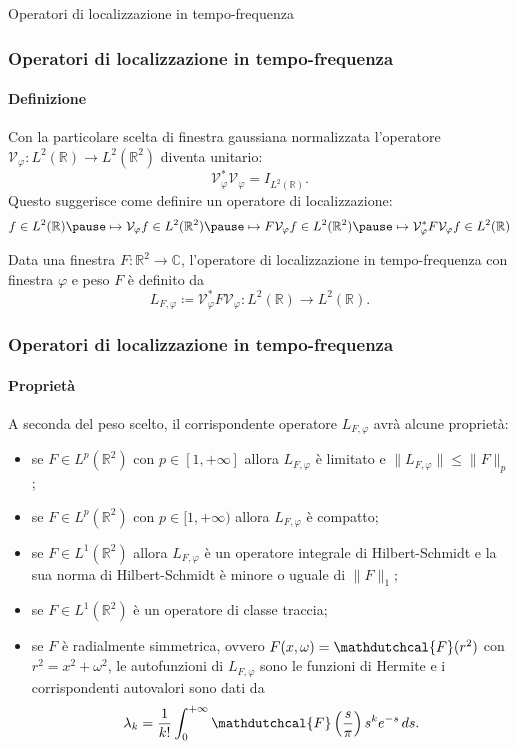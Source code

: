 \documentclass[aspectratio=141]{beamer}
\newcommand{\R}{\mathbb{R}} %
\newcommand{\V}{\mathcal{V}} %
\newcommand{\C}{\mathbb{C}} %
\begin{document}
\begin{section}{Operatori di localizzazione in tempo-frequenza}
	
	\begin{frame}
		\frametitle{Operatori di localizzazione in tempo-frequenza}
		\framesubtitle{Definizione}
		Con la particolare scelta di finestra gaussiana normalizzata l'operatore $\V_{\varphi} : L^2(\R) \rightarrow L^2(\R^2)$ diventa unitario:
		\begin{equation*}
			\V_{\varphi}^* \V_{\varphi} = I_{L^2(\R)}.
		\end{equation*}
		\pause
		Questo suggerisce come definire un operatore di localizzazione:
		\begin{equation*}
			f \in L^2(\R) \pause \mapsto \V_{\varphi} f \in L^2(\R^2) \pause \mapsto F \V_{\varphi} f \in L^2(\R^2) \pause \mapsto \V_{\varphi}^* F \V_{\varphi} f \in L^2(\R)
		\end{equation*}
		\onslide<5-> \begin{myblock}
			Data una finestra $F: \R^2 \rightarrow \C$, l'operatore di localizzazione in tempo-frequenza con finestra $\varphi$ e peso $F$ è definito da
			\begin{equation*}
				L_{F,\varphi} \coloneqq \V_{\varphi}^* F \V_{\varphi} : L^2(\R) \rightarrow L^2(\R).
			\end{equation*}
		\end{myblock}
	\end{frame}

	\begin{frame}
		\frametitle{Operatori di localizzazione in tempo-frequenza}
		\framesubtitle{Proprietà}
		A seconda del peso scelto, il corrispondente operatore $L_{F,\varphi}$ avrà alcune proprietà:
		\begin{itemize}
			\item se $F \in L^p (\R^2)$ con $p \in [1,+\infty]$ allora $L_{F,\varphi}$ è limitato e $\|L_{F,\varphi}\| \leq \|F\|_p$; \pause
			\item se $F \in L^p (\R^2)$ con $p \in [1,+\infty)$ allora $L_{F,\varphi}$ è compatto;\pause
			\item se $F \in L^1(\R^2)$ allora $L_{F,\varphi}$ è un operatore integrale di Hilbert-Schmidt e la sua norma di Hilbert-Schmidt è minore o uguale di $\|F\|_1$;\pause
			\item se $F \in L^1(\R^2)$ è un operatore di classe traccia;\pause
			\item se $F$ è radialmente simmetrica, ovvero $F(x,\omega) = \mathdutchcal{F}(r^2)$ con $r^2 = x^2 + \omega^2$, le autofunzioni di $L_{F,\varphi}$ sono le funzioni di Hermite e i corrispondenti autovalori sono dati da
			\begin{equation*}
				\lambda_k = \dfrac{1}{k!} \int_0^{+\infty} \mathdutchcal{F}\left(\dfrac{s}{\pi}\right) s^k e^{-s} \, ds.
			\end{equation*}
		\end{itemize}
	\end{frame}
\end{section}
\end{document}
